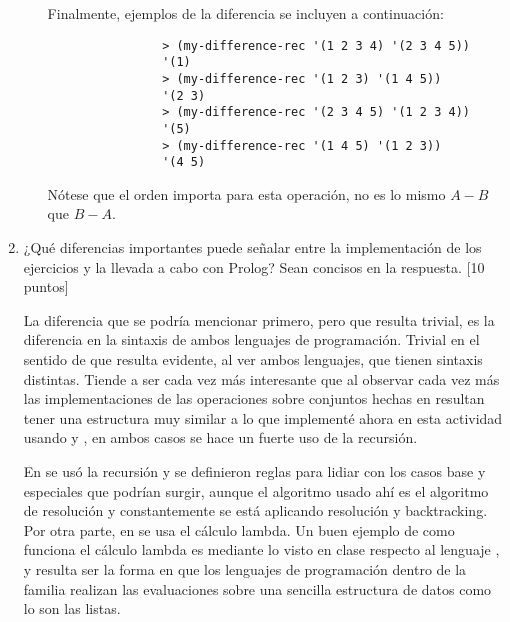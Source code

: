 \begin{enumerate}
\begin{itemize}
\begin{solution}
            Finalmente, ejemplos de la diferencia se incluyen a continuación:
            \begin{verbatim}
                > (my-difference-rec '(1 2 3 4) '(2 3 4 5))
                '(1)
                > (my-difference-rec '(1 2 3) '(1 4 5))
                '(2 3)
                > (my-difference-rec '(2 3 4 5) '(1 2 3 4))
                '(5)
                > (my-difference-rec '(1 4 5) '(1 2 3))
                '(4 5)
            \end{verbatim}

            Nótese que el orden importa para esta operación, no es lo mismo $A - B$ que $B - A$.
        \end{solution} 
    \end{itemize}
    \item ¿Qué diferencias importantes puede señalar entre la implementación de los ejercicios y la llevada a cabo con Prolog? Sean concisos en la respuesta. [10 puntos]
    \begin{solution}
        La diferencia que se podría mencionar primero, pero que resulta trivial, es la diferencia en la sintaxis de ambos lenguajes de programación. Trivial en el sentido de que resulta evidente, al ver ambos lenguajes, que tienen sintaxis distintas. Tiende a ser cada vez más interesante que al observar cada vez más las implementaciones de las operaciones sobre conjuntos hechas en  resultan tener una estructura muy similar a lo que implementé ahora en esta actividad usando  y , en ambos casos se hace un fuerte uso de la recursión. 
        
        En  se usó la recursión y se definieron reglas para lidiar con los casos base y especiales que podrían surgir, aunque el algoritmo usado ahí es el algoritmo de resolución y constantemente se está aplicando resolución y backtracking. Por otra parte, en  se usa el cálculo lambda. Un buen ejemplo de como funciona el cálculo lambda es mediante lo visto en clase \cite{guerra2022pia} respecto al lenguaje , y resulta ser la forma en que los lenguajes de programación dentro de la familia  realizan las evaluaciones sobre una sencilla estructura de datos como lo son las listas.


\end{solution}
\end{enumerate}

